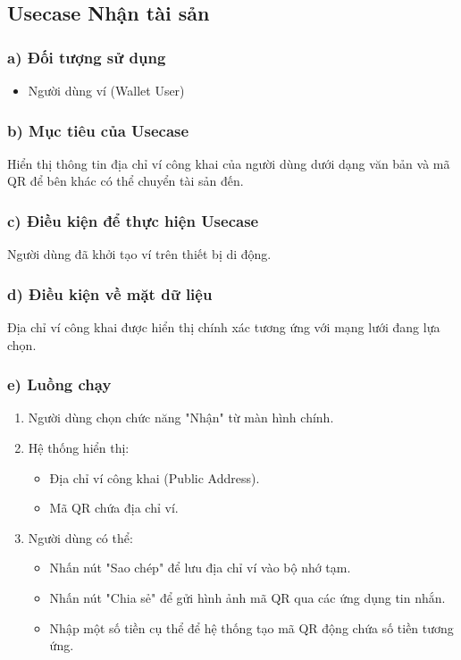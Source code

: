 \documentclass[a4paper]{report}
\begin{document}
\subsection{Usecase Nhận tài sản}

\subsubsection{a) Đối tượng sử dụng}
\begin{itemize}
    \item Người dùng ví (Wallet User)
\end{itemize}

\subsubsection{b) Mục tiêu của Usecase}
Hiển thị thông tin địa chỉ ví công khai của người dùng dưới dạng văn bản và mã QR để bên khác có thể chuyển tài sản đến.

\subsubsection{c) Điều kiện để thực hiện Usecase}
Người dùng đã khởi tạo ví trên thiết bị di động.

\subsubsection{d) Điều kiện về mặt dữ liệu}
Địa chỉ ví công khai được hiển thị chính xác tương ứng với mạng lưới đang lựa chọn.

\subsubsection{e) Luồng chạy}
\begin{enumerate}
    \item Người dùng chọn chức năng "Nhận" từ màn hình chính.
    \item Hệ thống hiển thị:
    \begin{itemize}
        \item Địa chỉ ví công khai (Public Address).
        \item Mã QR chứa địa chỉ ví.
    \end{itemize}
    \item Người dùng có thể:
    \begin{itemize}
        \item Nhấn nút "Sao chép" để lưu địa chỉ ví vào bộ nhớ tạm.
        \item Nhấn nút "Chia sẻ" để gửi hình ảnh mã QR qua các ứng dụng tin nhắn.
        \item Nhập một số tiền cụ thể để hệ thống tạo mã QR động chứa số tiền tương ứng.
    \end{itemize}
\end{enumerate}
\end{document}
